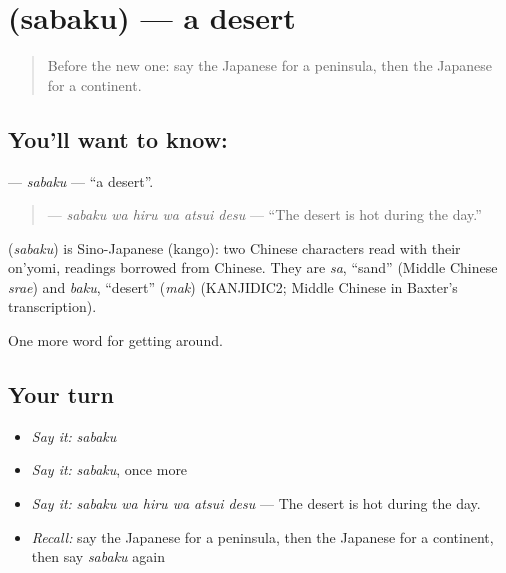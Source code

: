 \section[\texorpdfstring{\ja{さばく} (sabaku)}{さばく (sabaku)}]{ (sabaku) — a desert}

\label{lesson:JA-C413-sabaku}



\begin{quote}
Before the new one: say the Japanese for a peninsula, then the Japanese for a continent.
\end{quote}

\subsection*{You'll want to know: }
\textbf{} — \emph{sabaku} — \textquotedblleft{}a desert\textquotedblright{}.

\begin{quote}
\textbf{  } — \emph{sabaku wa hiru wa atsui desu} — \textquotedblleft{}The desert is hot during the day.\textquotedblright{}
\end{quote}

\begin{cousinweb}
\textbf{} (\emph{sabaku}) is Sino-Japanese (kango): two Chinese characters read with their on'yomi, readings borrowed from Chinese. They are \emph{sa}, \textquotedblleft{}sand\textquotedblright{} (Middle Chinese \emph{srae}) and \emph{baku}, \textquotedblleft{}desert\textquotedblright{} (\emph{mak}) (KANJIDIC2; Middle Chinese in Baxter's transcription).
\end{cousinweb}

\begin{grammarlens}[title={What you've built}]
One more word for getting around.
\end{grammarlens}

\subsection*{Your turn}
\begin{itemize}
\raggedright
  \item \emph{Say it:} \emph{sabaku}
  \item \emph{Say it:} \emph{sabaku}, once more
  \item \emph{Say it:} \emph{sabaku wa hiru wa atsui desu} — The desert is hot during the day.
  \item \emph{Recall:} say the Japanese for a peninsula, then the Japanese for a continent, then say \emph{sabaku} again
\end{itemize}

